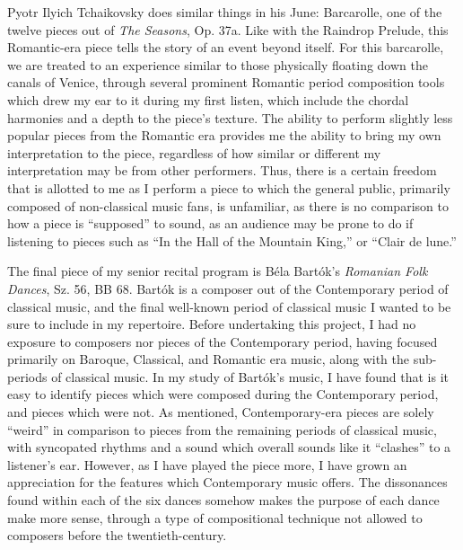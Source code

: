 Pyotr Ilyich Tchaikovsky does similar things in his June: Barcarolle, one of the twelve pieces out of \textit{The Seasons}, Op. 37a. Like with the Raindrop Prelude, this Romantic-era piece tells the story of an event beyond itself. For this barcarolle, we are treated to an experience similar to those physically floating down the canals of Venice, through several prominent Romantic period composition tools which drew my ear to it during my first listen, which include the chordal harmonies and a depth to the piece's texture. The ability to perform slightly less popular pieces from the Romantic era provides me the ability to bring my own interpretation to the piece, regardless of how similar or different my interpretation may be from other performers. Thus, there is a certain freedom that is allotted to me as I perform a piece to which the general public, primarily composed of non-classical music fans, is unfamiliar, as there is no comparison to how a piece is ``supposed'' to sound, as an audience may be prone to do if listening to pieces such as ``In the Hall of the Mountain King,'' or ``Clair de lune.''

The final piece of my senior recital program is Béla Bartók's \textit{Romanian Folk Dances}, Sz. 56, BB 68. Bartók is a composer out of the Contemporary period of classical music, and the final well-known period of classical music I wanted to be sure to include in my repertoire. Before undertaking this project, I had no exposure to composers nor pieces of the Contemporary period, having focused primarily on Baroque, Classical, and Romantic era music, along with the sub-periods of classical music. In my study of Bartók's music, I have found that is it easy to identify pieces which were composed during the Contemporary period, and pieces which were not. As mentioned, Contemporary-era pieces are solely ``weird'' in comparison to pieces from the remaining periods of classical music, with syncopated rhythms and a sound which overall sounds like it ``clashes'' to a listener's ear. However, as I have played the piece more, I have grown an appreciation for the features which Contemporary music offers. The dissonances found within each of the six dances somehow makes the purpose of each dance make more sense, through a type of compositional technique not allowed to composers before the twentieth-century. 